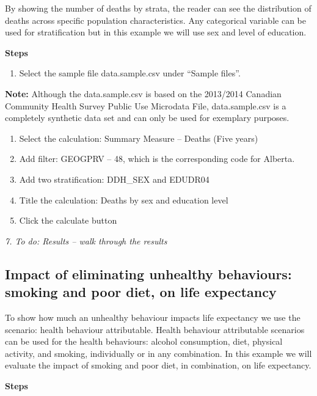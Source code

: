 \documentclass[]{book}
\providecommand{\tightlist}{%
  \setlength{\itemsep}{0pt}\setlength{\parskip}{0pt}}
\begin{document}
By showing the number of deaths by strata, the reader can see the
distribution of deaths across specific population characteristics. Any
categorical variable can be used for stratification but in this example
we will use sex and level of education.

\textbf{Steps}

\begin{enumerate}
\def\labelenumi{\arabic{enumi}.}
\tightlist
\item
  Select the sample file data.sample.csv under ``Sample files''.
\end{enumerate}

\textbf{Note:} Although the data.sample.csv is based on the 2013/2014
Canadian Community Health Survey Public Use Microdata File,
data.sample.csv is a completely synthetic data set and can only be used
for exemplary purposes.

\begin{enumerate}
\def\labelenumi{\arabic{enumi}.}
\setcounter{enumi}{1}
\item
  Select the calculation: Summary Measure -- Deaths (Five years)
\item
  Add filter: GEOGPRV -- 48, which is the corresponding code for
  Alberta.
\item
  Add two stratification: DDH\_SEX and EDUDR04
\item
  Title the calculation: Deaths by sex and education level
\item
  Click the calculate button
\end{enumerate}

\emph{7. To do: Results -- walk through the results}

\subsection{Impact of eliminating unhealthy behaviours: smoking and poor
diet, on life
expectancy}\label{impact-of-eliminating-unhealthy-behaviours-smoking-and-poor-diet-on-life-expectancy}

To show how much an unhealthy behaviour impacts life expectancy we use
the scenario: health behaviour attributable. Health behaviour
attributable scenarios can be used for the health behaviours: alcohol
consumption, diet, physical activity, and smoking, individually or in
any combination. In this example we will evaluate the impact of smoking
and poor diet, in combination, on life expectancy.

\textbf{Steps}
\end{document}
